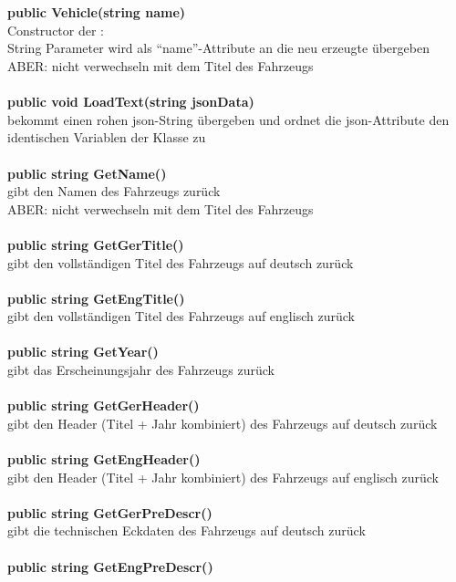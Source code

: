 \section{\vhc}
\label{sec:vhmeth}
%
\textbf{public Vehicle(string name)}\\
Constructor der \vhc:\\
String Parameter wird als \enquote{name}-Attribute an die neu erzeugte \vhi{} übergeben\\
ABER: nicht verwechseln mit dem Titel des Fahrzeugs\\
\\
\textbf{public void LoadText(string jsonData)}\\
bekommt einen rohen json-String übergeben und ordnet die json-Attribute den identischen Variablen der Klasse zu\\
\\
\textbf{public string GetName()}\\
gibt den Namen des Fahrzeugs zurück\\
ABER: nicht verwechseln mit dem Titel des Fahrzeugs\\
\\
\textbf{public string GetGerTitle()}\\
gibt den vollständigen Titel des Fahrzeugs auf deutsch zurück\\
\\
\textbf{public string GetEngTitle()}\\
gibt den vollständigen Titel des Fahrzeugs auf englisch zurück\\
\\
\textbf{public string GetYear()}\\
gibt das Erscheinungsjahr des Fahrzeugs zurück\\
\\
\textbf{public string GetGerHeader()}\\
gibt den Header (Titel + Jahr kombiniert) des Fahrzeugs auf deutsch zurück\\
\\
\textbf{public string GetEngHeader()}\\
gibt den Header (Titel + Jahr kombiniert) des Fahrzeugs auf englisch zurück\\
\\
\textbf{public string GetGerPreDescr()}\\
gibt die technischen Eckdaten des Fahrzeugs auf deutsch zurück\\
\\
\textbf{public string GetEngPreDescr()}\\
